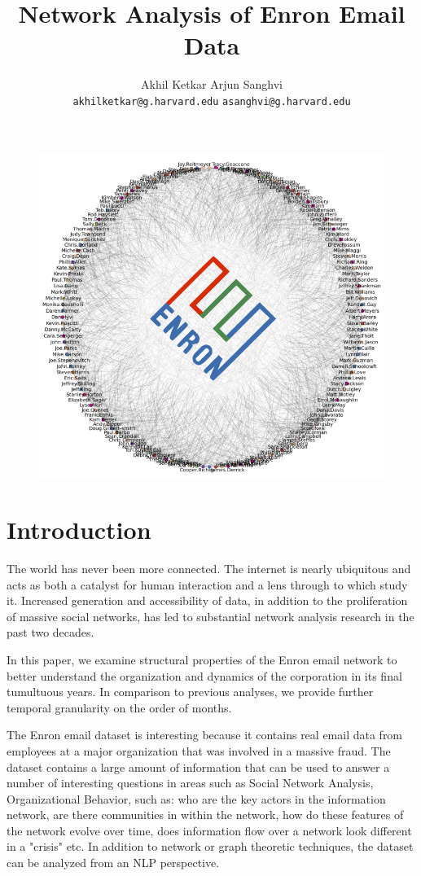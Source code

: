\documentclass[12pt]{article}
\author{Akhil Ketkar \hspace{4.1cm} Arjun Sanghvi \\
	\texttt{akhilketkar@g.harvard.edu} \hspace{1cm} \texttt{asanghvi@g.harvard.edu}}
\title{Network Analysis of Enron Email Data}
\begin{document}
\begin{figure}
\centering
\includegraphics[width=15cm]{EnronNetwork}
\end{figure}

\maketitle


\clearpage

\section{Introduction}
	The world has never been more connected. The internet is nearly ubiquitous and acts as both a catalyst for human interaction and a lens through to which study it. Increased generation and accessibility of data, in addition to the proliferation of massive social networks, has led to substantial network analysis research in the past two decades.
	
	In this paper, we examine structural properties of the Enron email network to better understand the organization and dynamics of the corporation in its final tumultuous years. In comparison to previous analyses, we provide further temporal granularity on the order of months.
				
	The Enron email dataset is interesting because it contains real email data from employees at a major organization that was involved in a massive fraud. The dataset contains a large amount of information that can be used to answer a number of interesting questions in areas such as Social Network Analysis, Organizational Behavior, such as: who are the key actors in the information network, are there communities in within the network, how do these features of the network evolve over time, does information flow over a network look different in a "crisis" etc. In addition to network or graph theoretic techniques, the dataset can be analyzed from an NLP perspective. 
\end{document}
